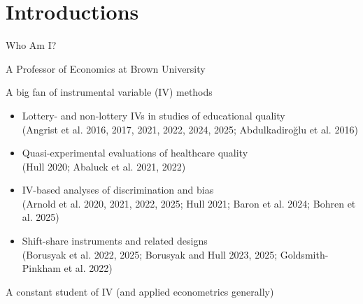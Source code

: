 \documentclass{beamer}
\begin{document}
 
\section{Introductions}

\begin{frame}{Who Am I?}

A Professor of Economics at Brown University\pause

A big fan of instrumental variable (IV) methods\pause
\begin{itemize}
  \item Lottery- and non-lottery IVs in studies of educational quality \\ {\scriptsize \textcolor{red!75!green!50!blue!25!gray}{(Angrist et al. 2016, 2017, 2021, 2022, 2024, 2025; Abdulkadiro\u{g}lu et al. 2016)}}
  \item Quasi-experimental evaluations of healthcare quality \\ {\scriptsize \textcolor{red!75!green!50!blue!25!gray}{(Hull 2020; Abaluck et al. 2021, 2022)}}
  \item IV-based analyses of discrimination and bias \\ {\scriptsize \textcolor{red!75!green!50!blue!25!gray}{(Arnold et al. 2020, 2021, 2022, 2025; Hull 2021; Baron et al. 2024; Bohren et al. 2025)}}
  \item Shift-share instruments and related designs \\ {\scriptsize \textcolor{red!75!green!50!blue!25!gray}{(Borusyak et al. 2022, 2025; Borusyak and Hull 2023, 2025; Goldsmith-Pinkham et al. 2022)}}
\end{itemize}\pause

A constant student of IV (and applied econometrics generally)

\end{frame}
\end{document}

